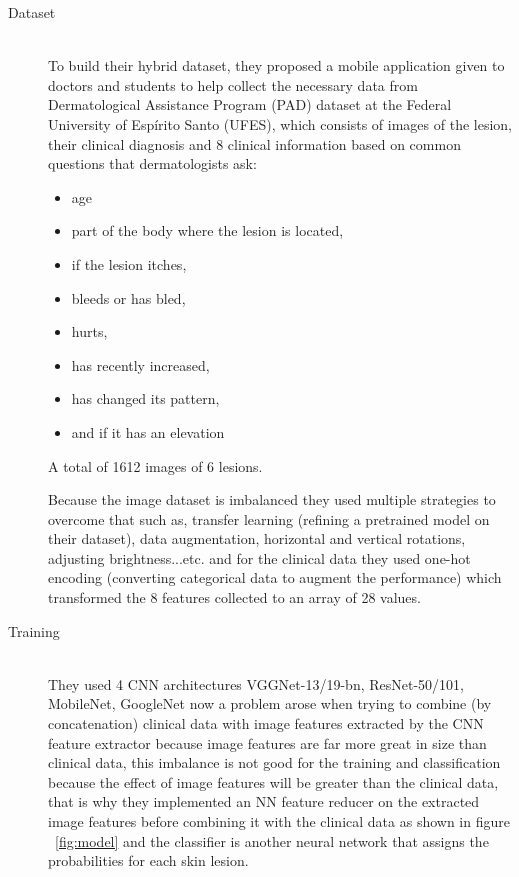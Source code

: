 \begin{description}
\item[Dataset] \hfill \\
To build their hybrid dataset, they proposed a mobile application given to doctors and students to help collect the necessary data from Dermatological Assistance Program (PAD) dataset at the Federal University of Espírito Santo (UFES), which consists of images of the lesion, their clinical diagnosis and 8 clinical information based on common questions that dermatologists ask:
\begin{itemize}
    \item age
    \item part of the body where the lesion is located,
    \item if the lesion itches,
    \item bleeds or has bled,
    \item hurts, 
    \item has recently increased, 
    \item has changed its pattern, 
    \item and if it has an elevation
\end{itemize}

A total of 1612 images of 6 lesions.

Because the image dataset is imbalanced they used multiple strategies to overcome that such as, transfer learning (refining a pretrained model on their dataset), data augmentation, horizontal and vertical rotations, adjusting brightness...etc. and for the clinical data they used one-hot encoding (converting categorical data to augment the performance) which transformed the 8 features collected to an array of 28 values.

\item[Training] \hfill \\
    They used 4 CNN architectures VGGNet-13/19-bn, ResNet-50/101, MobileNet, GoogleNet
    now a problem arose when trying to combine (by concatenation) clinical data with image features extracted by the CNN feature extractor because image features are far more great in size than clinical data, this imbalance is not good for the training and classification because the effect of image features will be greater than the clinical data, that is why they implemented an NN feature reducer on the extracted image features before combining it with the clinical data as shown in figure ~\ref{fig:model}  and the classifier is another neural network that assigns the probabilities for each skin lesion.


\end{description}
